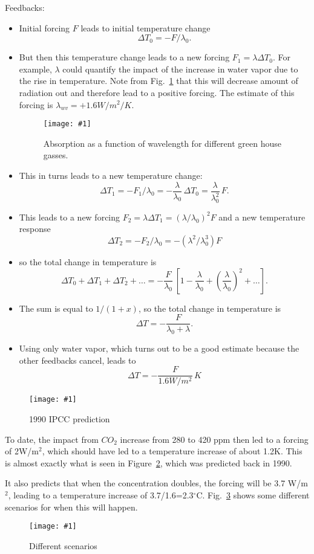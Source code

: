 \documentclass[tsecnumarabic,amssymb, nobibnotes, aps, prd]{revtex4-2}
\def\be{\begin{equation}}
\def\ee{\end{equation}}
\newcommand{\sfig}[2]{
\texttt{[image: \#1]}
        }
\newcommand{\Sfig}[2]{
   \begin{figure}[thbp]
   \begin{center}
    \sfig{Figures/#1.pdf}{0.7\columnwidth}
    \caption{{\small #2}}
    \label{fig:#1}
     \end{center}
   \end{figure}
}
\newcommand{\Spng}[2]{
   \begin{figure}[thbp]
   \begin{center}
    \sfig{Figures/#1.png}{0.8\columnwidth}
    \caption{{\small #2}}
    \label{fig:#1}
     \end{center}
   \end{figure}
}
\newcommand{\rf}[1]{\ref{fig:#1}}
\newcommand\bei{\begin{itemize}}
\newcommand\eei{\end{itemize}}
\begin{document}
Feedbacks:
\bei
\item Initial forcing $F$ leads to initial temperature change
\be
\Delta T_0 = -F/\lambda_0.\ee
\item But then this temperature change leads to a new forcing $F_1=\lambda \Delta T_0$. For example, $\lambda$ could quantify the impact of the increase in water vapor due to the rise in temperature.  Note from Fig.~\rf{ghg} that this will decrease amount of radiation out and therefore lead to a positive forcing. The estimate of this forcing is $\lambda_{wv}=+1.6 W/m^2/K$.
\Spng{ghg}{Absorption as a function of wavelength for different green house gasses.}
\item This in turns leads to a new temperature change:
\be
\Delta T_1 = -F_1/\lambda_0 = -\frac{\lambda}{\lambda_0}\, \Delta T_0 = \frac{\lambda}{\lambda_0^2}\,F.\ee 
\item This leads to a new forcing $F_2=\lambda \Delta T_1 = (\lambda/\lambda_0)^2 F$ and a new temperature response
\be
\Delta T_2 = -F_2/\lambda_0 = -(\lambda^2/\lambda_0^3) F
\ee
\item so the total change in temperature is
\be
\Delta T_0 + \Delta T_1 + \Delta T_2 + \ldots = -\frac{F}{\lambda_0}\, \left[ 1 - \frac{\lambda}{\lambda_0} + \left( \frac{\lambda}{\lambda_0} \right)^2 + \ldots \right].
\ee
\item The sum is equal to $1/(1+x)$, so the total change in temperature is
\be
\Delta T = -\frac{F}{\lambda_0 + \lambda}.\ee
\item Using only water vapor, which turns out to be a good estimate because the other feedbacks cancel, leads to
\be
\Delta T = -\frac{F}{1.6 W/m^2} \, K\ee
\eei

\Spng{1990}{1990 IPCC prediction}
To date, the impact from $CO_2$ increase from 280 to 420 ppm then led to a forcing of 2W/m$^2$, which should have led to a temperature increase of about 1.2K. This is almost exactly what is seen in Figure~\rf{1990}, which was predicted back in 1990.

It also predicts that when the concentration doubles, the forcing will be 3.7 W/m$^2$, leading to a temperature increase of 3.7/1.6=2.3$^\circ$C. Fig.~\rf{ipcc6fig} shows some different scenarios for when this will happen.

\Sfig{ipcc6fig}{Different scenarios}
\end{document}
